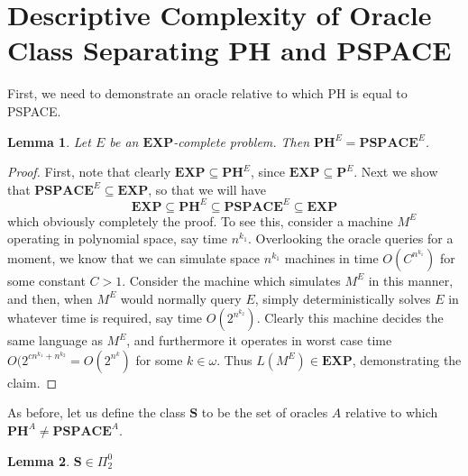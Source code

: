 \documentclass{article}
\theoremstyle{definition}
\theoremstyle{plain}
\theoremstyle{theorem}
\newtheorem{lemma}{Lemma}[section]
\begin{document}
\section{Descriptive Complexity of Oracle Class Separating PH and PSPACE}
First, we need to demonstrate an oracle relative to which PH is equal to PSPACE. 
\begin{lemma}
	Let $E$ be an $\bm{EXP}$-complete problem. Then $\bm{PH}^E = \bm{PSPACE}^E$. 
\end{lemma}
\begin{proof}
	First, note that clearly $\bm{EXP} \subseteq \bm{PH}^E$, since $\bm{EXP} \subseteq \bm{P}^E$. Next we show that $\bm{PSPACE}^E \subseteq \bm{EXP}$, so that we will have
	\[ \bm{EXP} \subseteq \bm{PH}^E \subseteq \bm{PSPACE}^E \subseteq \bm{EXP} \]
which obviously completely the proof. To see this, consider a machine $M^E$ operating in polynomial space, say time $n^{k_1}$. Overlooking the oracle queries for a moment, we know that we can simulate space $n^{k_1}$ machines in time $O(C^{n^{k_1}})$ for some constant $C > 1$. Consider the machine which simulates $M^E$ in this manner, and then, when $M^E$ would normally query $E$, simply deterministically solves $E$ in whatever time is required, say time $O(2^{n^{k_2}})$. Clearly this machine decides the same language as $M^E$, and furthermore it operates in worst case time $O(2^{cn^{k_1}+n^{k_2}} = O(2^{n^k})$ for some $k \in \omega$. Thus $L(M^E) \in \bm{EXP}$, demonstrating the claim.
\end{proof}
As before, let us define the class $\bm{S}$ to be the set of oracles $A$ relative to which $\bm{PH}^A \neq \bm{PSPACE}^A$. 
\begin{lemma}
	$\bm{S} \in \Pi^0_2$
\end{lemma}
\end{document}
